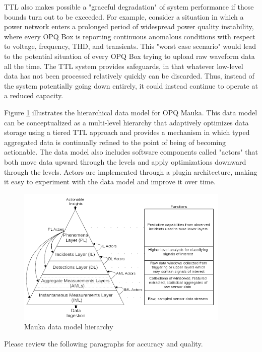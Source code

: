 TTL also makes possible a "graceful degradation" of system performance if those bounds turn out to be exceeded. For example, consider a situation in which a power network enters a prolonged period of widespread power quality instability, where every OPQ Box is reporting continuous anomalous conditions with respect to voltage, frequency, THD, and transients.  This "worst case scenario" would lead to the potential situation of every OPQ Box trying to upload raw waveform data all the time. The TTL system provides safeguards, in that whatever low-level data has not been processed relatively quickly can be discarded.  Thus, instead of the system potentially going down entirely, it could instead continue to operate at a reduced capacity.

Figure \ref{fig:mauka-data-model} illustrates the hierarchical data model for OPQ Mauka. This data model can be conceptualized as a multi-level hierarchy that adaptively optimizes data storage using a tiered TTL approach and provides a mechanism in which typed aggregated data is continually refined to the point of being of becoming actionable. The data model also includes software components called "actors" that both move data upward through the levels and apply optimizations downward through the levels. Actors are implemented through a plugin architecture, making it easy to experiment with the data model and improve it over time.

\begin{figure}
\center \includegraphics[width=4in]{images/mauka/mauka-data-model.png}
\caption{Mauka data model hierarchy}
\label{fig:mauka-data-model}
\end{figure}

\begin{tcolorbox}[colback=red!5!white,colframe=red!75!black,title=ANTHONY]
Please review the following paragraphs for accuracy and quality.
\end{tcolorbox}

